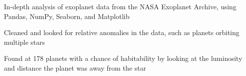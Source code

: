 \documentclass[]{resume-template}
\begin{document}
\begin{minipage}[t]{0.66\textwidth}


        \label{subsec:exo-eda}
        \begin{tightemize}
            \item In-depth analysis of exoplanet data from the NASA Exoplanet Archive, using Pandas, NumPy,
            Seaborn, and Matplotlib
            \item Cleaned and looked for relative anomalies in the data, such as planets orbiting multiple stars
            \item Found at 178 planets with a chance of habitability by looking at the luminosity and distance the planet was away from the star


\end{tightemize}
\end{minipage}
\end{document}
